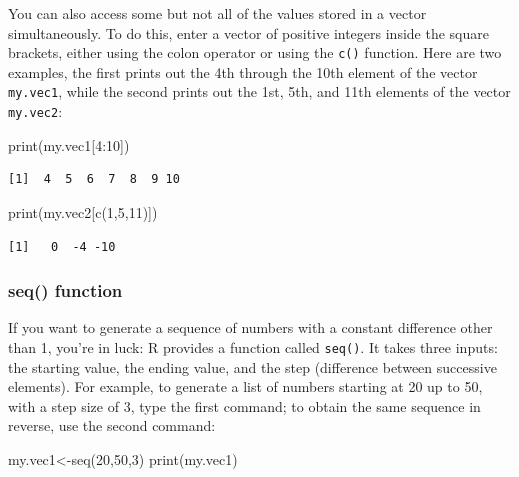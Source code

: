 \documentclass[
  letterpaper,
  DIV=11,
  numbers=noendperiod]{scrreprt}
\newenvironment{Shaded}{\begin{snugshade}}{\end{snugshade}}
\newcommand{\DecValTok}[1]{\textcolor[rgb]{0.68,0.00,0.00}{#1}}
\newcommand{\FunctionTok}[1]{\textcolor[rgb]{0.28,0.35,0.67}{#1}}
\newcommand{\NormalTok}[1]{\textcolor[rgb]{0.00,0.23,0.31}{#1}}
\newcommand{\OtherTok}[1]{\textcolor[rgb]{0.00,0.23,0.31}{#1}}
\newcommand{\SpecialCharTok}[1]{\textcolor[rgb]{0.37,0.37,0.37}{#1}}
\begin{document}
You can also access some but not all of the values stored in a vector
simultaneously. To do this, enter a vector of positive integers inside
the square brackets, either using the colon operator or using the
\texttt{c()} function. Here are two examples, the first prints out the
4th through the 10th element of the vector \texttt{my.vec1}, while the
second prints out the 1st, 5th, and 11th elements of the vector
\texttt{my.vec2}:

\begin{Shaded}
\begin{Highlighting}[]
\FunctionTok{print}\NormalTok{(my.vec1[}\DecValTok{4}\SpecialCharTok{:}\DecValTok{10}\NormalTok{])}
\end{Highlighting}
\end{Shaded}

\begin{verbatim}
[1]  4  5  6  7  8  9 10
\end{verbatim}

\begin{Shaded}
\begin{Highlighting}[]
\FunctionTok{print}\NormalTok{(my.vec2[}\FunctionTok{c}\NormalTok{(}\DecValTok{1}\NormalTok{,}\DecValTok{5}\NormalTok{,}\DecValTok{11}\NormalTok{)])}
\end{Highlighting}
\end{Shaded}

\begin{verbatim}
[1]   0  -4 -10
\end{verbatim}

\hypertarget{seq-function}{%
\subsubsection{seq() function}\label{seq-function}}

If you want to generate a sequence of numbers with a constant difference
other than 1, you're in luck: R provides a function called
\texttt{seq()}. It takes three inputs: the starting value, the ending
value, and the step (difference between successive elements). For
example, to generate a list of numbers starting at 20 up to 50, with a
step size of 3, type the first command; to obtain the same sequence in
reverse, use the second command:

\begin{Shaded}
\begin{Highlighting}[]
\NormalTok{my.vec1}\OtherTok{\textless{}{-}}\FunctionTok{seq}\NormalTok{(}\DecValTok{20}\NormalTok{,}\DecValTok{50}\NormalTok{,}\DecValTok{3}\NormalTok{)}
\FunctionTok{print}\NormalTok{(my.vec1)}
\end{Highlighting}
\end{Shaded}
\end{document}
